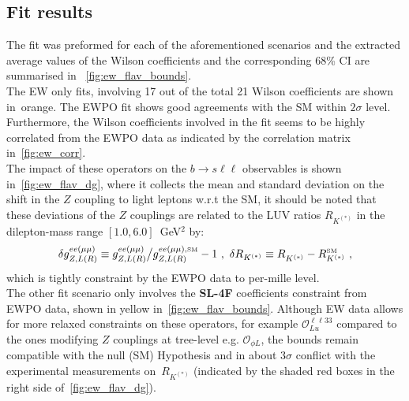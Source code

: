 \subsection{Fit results}
\label{sec:EFT_results}
The fit was preformed for each of the aforementioned scenarios and the extracted average values of the Wilson coefficients and the corresponding 68\% CI are summarised in ~\autoref{fig:ew_flav_bounds}.\\ The EW only fits, involving 17 out of the total 21 Wilson coefficients are shown in~\textcolor[HTML]{be3d04}{orange}. The EWPO fit shows good agreements with the SM within $2\sigma$ level. Furthermore, the Wilson coefficients involved in the fit seems to be highly correlated from the EWPO data as indicated by the correlation matrix in~\autoref{fig:ew_corr}. \\
The impact of these operators on the $ b \to s \ell \ell$ observables is shown in~\autoref{fig:ew_flav_dg}, where  it collects the mean and standard deviation on the shift in the $Z$ coupling to light leptons w.r.t the SM, it should be noted that these deviations of the $Z$ couplings are related to the LUV ratios   $R_{K^{(*)}}$ in the dilepton-mass range $[1.0,6.0]$~GeV$^2$ by: 
\begin{equation}
	\label{eq:SMdev}
	\delta g_{Z,L(R)}^{ee(\mu\mu)} \equiv g_{Z,L(R)}^{ee(\mu\mu)}{\big/}g_{Z,L(R)}^{ee(\mu\mu),\textrm{\tiny SM}}-1  \ , \ \delta R_{K^{(*)}} \equiv R_{K^{(*)}}^{ } - R_{K^{(*)}}^{\textrm{\tiny SM}} \ ,
\end{equation}
which is tightly constraint by the EWPO data to per-mille level. \\
The other fit scenario only involves the \textbf{ SL-4F} coefficients constraint from EWPO data, shown in \textcolor[HTML]{c2b109}{yellow}  in~\autoref{fig:ew_flav_bounds}. Although EW data allows for more relaxed constraints on these operators, for example $\mathcal{O}_{Lu}^{\ell \ell 33}$ compared to the ones modifying $Z$ couplings at tree-level e.g. $\mathcal{O}_{\phi L}$, the bounds remain compatible with the null (SM) Hypothesis and in about $3\sigma$ conflict with the experimental measurements on~$R_{K^{(*)}}$  (indicated by the shaded red boxes in the right side of~\autoref{fig:ew_flav_dg}).  
\\
